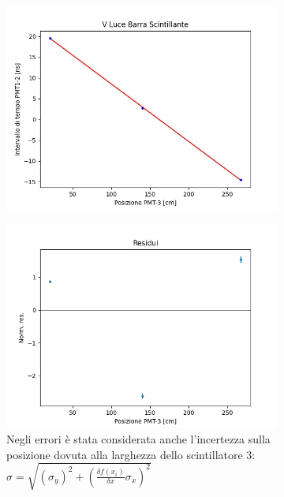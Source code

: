 \documentclass[a4paper]{article}
\begin{document}
\begin{figure}[H]
     \begin{subfigure}[b]{0.47\textwidth}
         \centering
         \includegraphics[width=\textwidth]{./immagini/TimeOfFlight/VLightBarraADC}
         \caption{}
         \label{fig:FitVLightBarraADC}
     \end{subfigure}
     \hfill
     \begin{subfigure}[b]{0.47\textwidth}
         \centering
         \includegraphics[width=\textwidth]{./immagini/TimeOfFlight/ResVLightBarraADC}
         \caption{Negli errori è stata considerata anche l'incertezza sulla posizione dovuta alla larghezza dello scintillatore 3: $\sigma = \sqrt{(\sigma _y)^2 + (\frac{\delta f(x_i)}{\delta x}\sigma _x)^2}$}
         \label{fig:ResVLIghtBarraADC}
     \end{subfigure}
     \caption{}        
     \label{fig:FitLinVLightBarraADC}
\end{figure}
\end{document}
